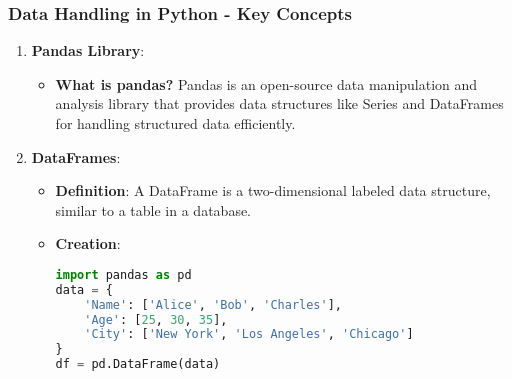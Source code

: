 \documentclass[aspectratio=169]{beamer}
\begin{document}
\begin{frame}[fragile]
    \frametitle{Data Handling in Python - Key Concepts}
    \begin{enumerate}
        \item \textbf{Pandas Library}:
            \begin{itemize}
                \item \textbf{What is pandas?} 
                Pandas is an open-source data manipulation and analysis library that provides data structures like Series and DataFrames for handling structured data efficiently.
            \end{itemize}
        
        \item \textbf{DataFrames}:
            \begin{itemize}
                \item \textbf{Definition}: A DataFrame is a two-dimensional labeled data structure, similar to a table in a database.
                \item \textbf{Creation}:
                \begin{lstlisting}[language=Python]
import pandas as pd
data = {
    'Name': ['Alice', 'Bob', 'Charles'],
    'Age': [25, 30, 35],
    'City': ['New York', 'Los Angeles', 'Chicago']
}
df = pd.DataFrame(data)
                \end{lstlisting}
            \end{itemize}
    \end{enumerate}
\end{frame}
\end{document}
